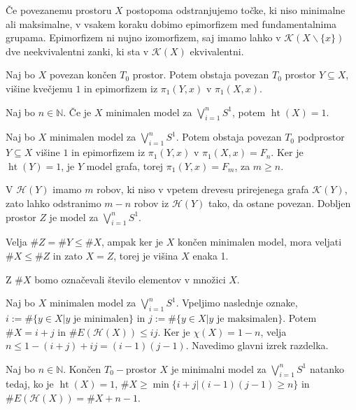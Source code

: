 \documentclass[mat1]{fmfdelo}
\DeclareRobustCommand{\h}{
    \mathcal{H}}
\DeclareMathOperator*{\htt}{ht}
\newcommand{\N}{\mathbb N}
\begin{document}
Če povezanemu prostoru $X$ postopoma odstranjujemo točke, ki niso minimalne ali maksimalne, v vsakem koraku dobimo epimorfizem med fundamentalnima grupama. Epimorfizem ni nujno izomorfizem, saj imamo lahko v $\mathcal{K}(X\backslash\{x\})$ dve neekvivalentni zanki, ki sta v $\mathcal{K}(X)$ ekvivalentni.



\begin{posledica}
    Naj bo $X$ povezan končen $T_0$ prostor. Potem obstaja povezan $T_0$ prostor $Y\subseteq X$, višine kvečjemu $1$ in epimorfizem iz $\pi_1(Y,x)$ v $\pi_1(X,x)$.
\end{posledica}

\begin{trditev}
    Naj bo $n\in\N$. Če je $X$ minimalen model za 
    $\bigvee\limits_{i=1}^{n}S^1$, potem $\htt(X)=1$.
\end{trditev}

\begin{dokaz}
    Naj bo $X$ minimalen model za $\bigvee\limits_{i=1}^{n}S^1$. Potem obstaja povezan $T_0$ podprostor $Y\subseteq X$ višine $1$ in epimorfizem iz $\pi_1(Y,x)$ v $\pi_1(X,x)=F_n$.
Ker je $\htt(Y)=1$, je $Y$ model grafa, torej $\pi_1(Y,x)=F_m$, za $m\geq n$.

    V $\h(Y)$ imamo $m$ robov, ki niso v vpetem drevesu prirejenega grafa $\mathcal{K}(Y)$, zato lahko odstranimo $m-n$ robov iz $\h(Y)$ tako, da ostane povezan. Dobljen prostor $Z$ je model za $\bigvee\limits_{i=1}^{n}S^1$.

    Velja $\#Z=\#Y\leq \#X$, ampak ker je $X$ končen minimalen model, mora veljati $\#X\leq\#Z$ in zato $X=Z$, torej je višina $X$ enaka 1.
\end{dokaz}
Z $\# X$ bomo označevali število elementov v množici $X$.

Naj bo $X$ minimalen model za $\bigvee\limits_{i=1}^{n}S^1$. Vpeljimo naslednje oznake, $i:=\#\{y\in X| y \text{ je minimalen}\}$ in $j:=\#\{y\in X| y \text{ je maksimalen}\}$. Potem $\#X=i+j$ in $\#E(\h(X))\leq ij$. Ker je $\chi(X)=1-n$, velja $n\leq 1 - (i+j) + ij=(i-1)(j-1)$. Navedimo glavni izrek razdelka.

\begin{izrek}
    Naj bo $n\in\N$. Končen $T_0-$prostor $X$ je minimalni model za  $\bigvee\limits_{i=1}^{n}S^1$ natanko tedaj, ko je $\htt(X)=1$, $\#X\geq\min\{i+j|(i-1)(j-1)\geq n\}$ in $\#E(\h(X))= \#X + n -1.$
\end{izrek}
\end{document}
